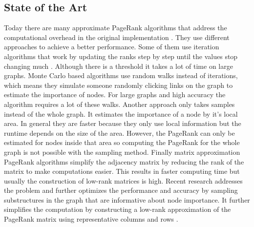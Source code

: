 \documentclass[a4paper,12pt]{article}
\begin{document}
\begin{multicols}{2}


\section{State of the Art}
Today there are many approximate PageRank algorithms that address the computational overhead in the original implementation \cite{wu_efficient_2024}. They use different approaches to achieve a better performance. Some of them use iteration algorithms that work by updating the ranks step by step until the values stop changing much \cite{xie_parameterized_2023}\cite{anikin_efficient_2022}. Although there is a threshold it takes a lot of time on large graphs. Monte Carlo based algorithms use random walks instead of iterations, which means they simulate someone randomly clicking links on the graph to estimate the importance of nodes. For large graphs and high accuracy the algorithm requires a lot of these walks. Another approach only takes samples instead of the whole graph. It estimates the importance of a node by it's local area. In general they are faster because they only use local information but the runtime depends on the size of the area. However, the PageRank can only be estimated for nodes inside that area so computing the PageRank for the whole graph is not possible with the sampling method. Finally matrix approximation PageRank algorithms simplify the adjacency matrix by reducing the rank of the matrix to make computations easier. This results in faster computing time but usually the construction of low-rank matrices is high. Recent research addresses the problem and further optimizes the performance and accuracy by sampling substructures in the graph that are informative about node importance. It further simplifies the computation by constructing a low-rank approximation of the PageRank matrix using representative columns and rows \cite{wu_efficient_2024}. 


\end{multicols}
\end{document}

